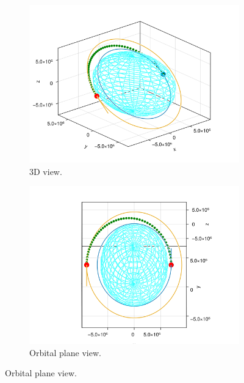 \documentclass{beamer}
\begin{document}
\begin{frame}
    \begin{figure}[htbp]
        \centering
        \begin{subfigure}{0.49\textwidth}
            \includegraphics[width=\textwidth]{../report/img/hohmann_solved.png}
            \caption{3D view.}
        \end{subfigure}
        \begin{subfigure}{0.49\textwidth}
            \includegraphics[width=\textwidth]{../report/img/hohmann_solved_in_plane.png}
            \caption{Orbital plane view.}
        \end{subfigure}
        \label{fig:hohmann_traj}
    \end{figure}
\end{frame}
\end{document}
